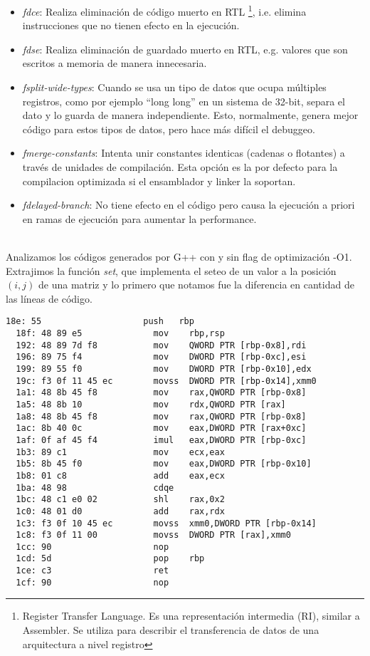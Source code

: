 \begin{itemize}
	\item \textit{fdce}: Realiza eliminación de código muerto en RTL \footnote{Register Transfer Language. Es una representación intermedia (RI), similar a Assembler. Se utiliza para describir el transferencia de datos de una arquitectura a nivel registro}, i.e. elimina instrucciones que no tienen efecto en la ejecución.
	\item \textit{fdse}: Realiza eliminación de guardado muerto en RTL, e.g. valores que son escritos a memoria de manera innecesaria.
	\item \textit{fsplit-wide-types}: Cuando se usa un tipo de datos que ocupa múltiples registros, como por ejemplo ``long long'' en un sistema de 32-bit, separa el dato y lo guarda de manera independiente. Esto, normalmente, genera mejor código para estos tipos de datos, pero hace más difícil el debuggeo.
	\item \textit{fmerge-constants}: Intenta unir constantes identicas (cadenas o flotantes) a través de unidades de compilación. Esta opción es la por defecto para la compilacion optimizada si el ensamblador y linker la soportan.
	\item \textit{fdelayed-branch}: No tiene efecto en el código pero causa la ejecución a priori en ramas de ejecución para aumentar la performance.
\end{itemize}

~\\

Analizamos los códigos generados por G++ con y sin flag de optimización -O1. Extrajimos la función \textit{set}, que implementa el seteo de un valor a la posición $(i, j)$ de una matriz y lo primero que notamos fue la diferencia en cantidad de las líneas de código.

\begin{lstlisting}[title=Función set de mat2]
  18e: 55                    push   rbp
  18f: 48 89 e5              mov    rbp,rsp
  192: 48 89 7d f8           mov    QWORD PTR [rbp-0x8],rdi
  196: 89 75 f4              mov    DWORD PTR [rbp-0xc],esi
  199: 89 55 f0              mov    DWORD PTR [rbp-0x10],edx
  19c: f3 0f 11 45 ec        movss  DWORD PTR [rbp-0x14],xmm0
  1a1: 48 8b 45 f8           mov    rax,QWORD PTR [rbp-0x8]
  1a5: 48 8b 10              mov    rdx,QWORD PTR [rax]
  1a8: 48 8b 45 f8           mov    rax,QWORD PTR [rbp-0x8]
  1ac: 8b 40 0c              mov    eax,DWORD PTR [rax+0xc] 
  1af: 0f af 45 f4           imul   eax,DWORD PTR [rbp-0xc]
  1b3: 89 c1                 mov    ecx,eax
  1b5: 8b 45 f0              mov    eax,DWORD PTR [rbp-0x10]
  1b8: 01 c8                 add    eax,ecx
  1ba: 48 98                 cdqe   
  1bc: 48 c1 e0 02           shl    rax,0x2
  1c0: 48 01 d0              add    rax,rdx
  1c3: f3 0f 10 45 ec        movss  xmm0,DWORD PTR [rbp-0x14]
  1c8: f3 0f 11 00           movss  DWORD PTR [rax],xmm0
  1cc: 90                    nop
  1cd: 5d                    pop    rbp
  1ce: c3                    ret    
  1cf: 90                    nop
\end{lstlisting}

